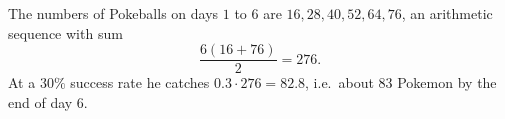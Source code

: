The numbers of Pokeballs on days $1$ to $6$ are $16,28,40,52,64,76$, an arithmetic sequence with sum
\[
\dfrac{6(16+76)}{2}=276 .
\]
At a $30\%$ success rate he catches $0.3\cdot276=82.8$, i.e.\ about $\boxed{83}$ Pokemon by the end of day $6$.
